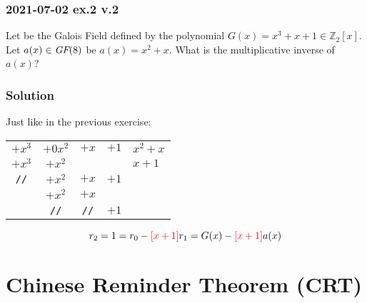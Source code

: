 \newpage
\subsubsection{2021-07-02 ex.2 v.2}
Let  be the Galois Field defined by the polynomial $G(x)=x^3+x+1\in\mathbb{Z}_2[x]$. Let $a(x)\in\textit{GF}(8)$ be $a(x)=x^2+x$. What is the multiplicative inverse of $a(x)$?
\subsubsection*{Solution}
Just like in the previous exercise:
\begin{center}
    \begin{tabular}{cccc|l}
         $+x^3$&$+0x^2$&$+x$&$+1$&$x^2+x$\\
         \cline{5-5}
         $+x^3$&$+x^2$&&&$x+1$\\
         \cline{1-4}
         \texttt{//}&$+x^2$&$+x$&$+1$&\\
         &$+x^2$&$+x$&&\\
         \cline{2-4}
         &\texttt{//}&\texttt{//}&$+1$&
    \end{tabular}
\end{center}
$$r_2=1=r_0-\textcolor{red}{[x+1]}r_1=G(x)-\textcolor{red}{[x+1]}a(x)$$

\newpage
\section{Chinese Reminder Theorem (CRT)}
